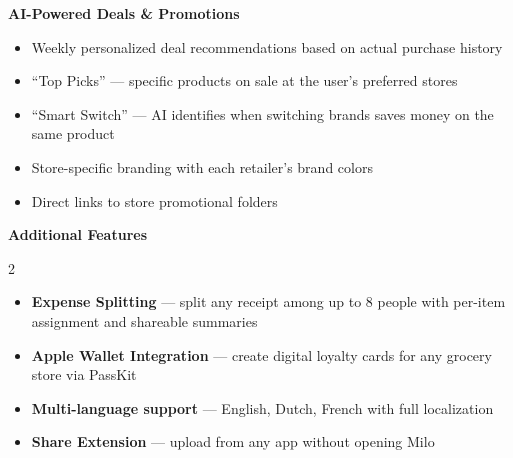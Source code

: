 \documentclass[11pt,a4paper]{article}
\begin{document}
\vspace{0.5em}

\begin{appbox}
{\color{milopurple!80}\fontsize{14}{17}\selectfont\bfseries AI-Powered Deals \& Promotions}

\vspace{0.3em}
\begin{itemize}[leftmargin=1em, itemsep=2pt, font=\small]
  \item Weekly personalized deal recommendations based on actual purchase history
  \item ``Top Picks'' --- specific products on sale at the user's preferred stores
  \item ``Smart Switch'' --- AI identifies when switching brands saves money on the same product
  \item Store-specific branding with each retailer's brand colors
  \item Direct links to store promotional folders
\end{itemize}
\end{appbox}

\vspace{0.5em}

\begin{appbox}
{\color{milopurple!80}\fontsize{14}{17}\selectfont\bfseries Additional Features}

\vspace{0.3em}
\begin{multicols}{2}
\begin{itemize}[leftmargin=1em, itemsep=2pt, font=\small]
  \item \textbf{Expense Splitting} --- split any receipt among up to 8 people with per-item assignment and shareable summaries
  \item \textbf{Apple Wallet Integration} --- create digital loyalty cards for any grocery store via PassKit
  \item \textbf{Multi-language support} --- English, Dutch, French with full localization
  \item \textbf{Share Extension} --- upload from any app without opening Milo
\end{itemize}
\end{multicols}
\end{appbox}

\clearpage

\end{document}
